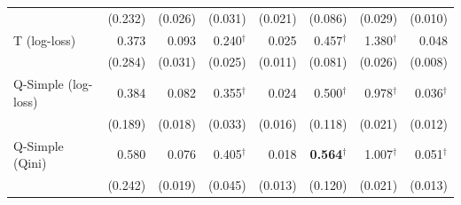 \begin{tabular}{l|rrrrrrr}
 & \scriptsize (0.232) & \scriptsize (0.026) & \scriptsize (0.031) & \scriptsize (0.021) & \scriptsize (0.086) & \scriptsize (0.029) & \scriptsize (0.010) \\[2pt]
T (log-loss) & 0.373 & 0.093 & 0.240$^\dagger$ & 0.025 & 0.457$^\dagger$ & 1.380$^\dagger$ & 0.048 \\
 & \scriptsize (0.284) & \scriptsize (0.031) & \scriptsize (0.025) & \scriptsize (0.011) & \scriptsize (0.081) & \scriptsize (0.026) & \scriptsize (0.008) \\[2pt]
Q-Simple (log-loss) & 0.384 & 0.082 & 0.355$^\dagger$ & 0.024 & 0.500$^\dagger$ & 0.978$^\dagger$ & 0.036$^\dagger$ \\
 & \scriptsize (0.189) & \scriptsize (0.018) & \scriptsize (0.033) & \scriptsize (0.016) & \scriptsize (0.118) & \scriptsize (0.021) & \scriptsize (0.012) \\[2pt]
Q-Simple (Qini) & 0.580 & 0.076 & 0.405$^\dagger$ & 0.018 & \textbf{0.564}$^\dagger$ & 1.007$^\dagger$ & 0.051$^\dagger$ \\
 & \scriptsize (0.242) & \scriptsize (0.019) & \scriptsize (0.045) & \scriptsize (0.013) & \scriptsize (0.120) & \scriptsize (0.021) & \scriptsize (0.013) \\[2pt]
\hline
\end{tabular}
